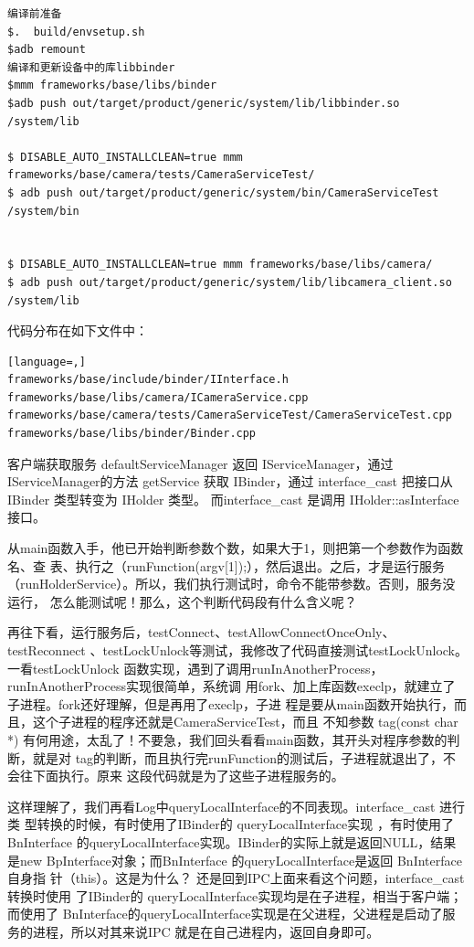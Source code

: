\documentclass[a4paper,11pt]{article}
\begin{document}
\begin{appendices}
\begin{lstlisting}
编译前准备
$.  build/envsetup.sh
$adb remount
编译和更新设备中的库libbinder
$mmm frameworks/base/libs/binder
$adb push out/target/product/generic/system/lib/libbinder.so  /system/lib

$ DISABLE_AUTO_INSTALLCLEAN=true mmm frameworks/base/camera/tests/CameraServiceTest/
$ adb push out/target/product/generic/system/bin/CameraServiceTest  /system/bin


$ DISABLE_AUTO_INSTALLCLEAN=true mmm frameworks/base/libs/camera/
$ adb push out/target/product/generic/system/lib/libcamera_client.so /system/lib
\end{lstlisting}

代码分布在如下文件中：
\begin{lstlisting}[language=,]
frameworks/base/include/binder/IInterface.h
frameworks/base/libs/camera/ICameraService.cpp
frameworks/base/camera/tests/CameraServiceTest/CameraServiceTest.cpp
frameworks/base/libs/binder/Binder.cpp
\end{lstlisting}
客户端获取服务
defaultServiceManager  返回 IServiceManager，通过 IServiceManager的方法 getService 获取 IBinder，通过 interface_cast 把接口从 IBinder 类型转变为 IHolder 类型。
而interface_cast 是调用 IHolder::asInterface 接口。

从main函数入手，他已开始判断参数个数，如果大于1，则把第一个参数作为函数名、查
表、执行之（runFunction(argv[1]);），然后退出。之后，才是运行服务
（runHolderService）。所以，我们执行测试时，命令不能带参数。否则，服务没运行，
怎么能测试呢！那么，这个判断代码段有什么含义呢？

再往下看，运行服务后，testConnect、testAllowConnectOnceOnly、testReconnect
、testLockUnlock等测试，我修改了代码直接测试testLockUnlock。一看testLockUnlock
函数实现，遇到了调用runInAnotherProcess，runInAnotherProcess实现很简单，系统调
用fork、加上库函数execlp，就建立了子进程。fork还好理解，但是再用了execlp，子进
程是要从main函数开始执行，而且，这个子进程的程序还就是CameraServiceTest，而且
不知参数 tag(const char *)
有何用途，太乱了！不要急，我们回头看看main函数，其开头对程序参数的判断，就是对
tag的判断，而且执行完runFunction的测试后，子进程就退出了，不会往下面执行。原来
这段代码就是为了这些子进程服务的。

这样理解了，我们再看Log中queryLocalInterface的不同表现。interface_cast 进行类
型转换的时候，有时使用了IBinder的 queryLocalInterface实现 ，有时使用了
BnInterface 的queryLocalInterface实现。IBinder的实际上就是返回NULL，结果是new
BpInterface对象；而BnInterface 的queryLocalInterface是返回 BnInterface 自身指
针（this）。这是为什么？ 还是回到IPC上面来看这个问题，interface_cast转换时使用
了IBinder的 queryLocalInterface实现均是在子进程，相当于客户端；而使用了
BnInterface的queryLocalInterface实现是在父进程，父进程是启动了服务的进程，所以对其来说IPC
就是在自己进程内，返回自身即可。


\end{appendices}
\end{document}
